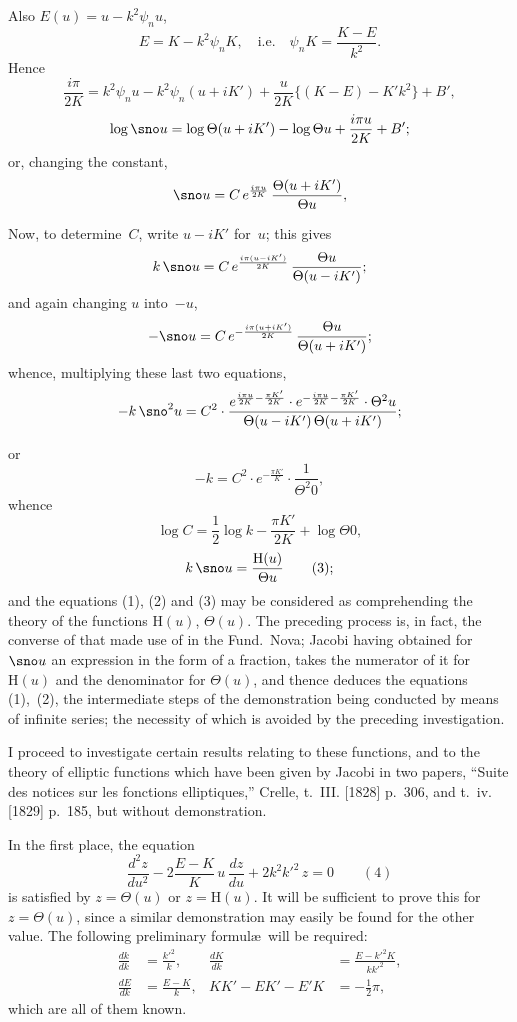 \documentclass[11pt,a4paper]{book}
\begin{document}
Also $E(u) = u - k^2\psi_n u$,
\[
E = K - k^2\psi_n K, \quad \text{i.e.}\quad \psi_n K = \frac{K-E}{k^2}.
\]
Hence
\[
\frac{i\pi}{2K} = k^2\psi_n u - k^2\psi_n(u+iK') + \frac{u}{2K}\{(K-E) - K'k^2\} + B',
\]
\[
\log \sno u = \log \Theta(u+iK') - \log \Theta u + \frac{i\pi u}{2K} + B';
\]
or, changing the constant,
\[
\sno u = C \, e^{\frac{i\pi u}{2K}} \, \frac{\Theta(u+iK')}{\Theta u},
\]

Now, to determine~$C$, write $u-iK'$ for~$u$; this gives
\[
k\,\sno u = C \, e^{\frac{i\pi(u-iK')}{2K}} \, \frac{\Theta u}{\Theta(u-iK')};
\]
and again changing $u$ into~$-u$,
\[
-\sno u = C \, e^{-\frac{i\pi(u+iK')}{2K}} \, \frac{\Theta u}{\Theta(u+iK')};
\]
whence, multiplying these last two equations,
\[
-k\,\sno^2 u = C^2 \cdot \frac{e^{\frac{i\pi u}{2K} - \frac{\pi K'}{2K}} \cdot e^{-\frac{i\pi u}{2K} - \frac{\pi K'}{2K}} \cdot \Theta^2 u}{\Theta(u-iK')\,\Theta(u+iK')};
\]

\newpage
or
\[
-k = C^2 \cdot e^{-\frac{\pi K'}{K}} \cdot \frac{1}{\Theta^2 0},
\]
whence
\[
\log C = \frac{1}{2}\log k - \frac{\pi K'}{2K} + \log \Theta 0,
\]
\[
k\,\sno u = \frac{\mathrm{H}(u)}{\Theta u} \qquad(3);
\]
and the equations (1), (2) and (3) may be considered as comprehending the theory of the functions $\mathrm{H}(u)$, $\Theta(u)$. The preceding process is, in fact, the converse of that made use of in the Fund.\ Nova; Jacobi having obtained for $\sno u$ an expression in the form of a fraction, takes the numerator of it for $\mathrm{H}(u)$ and the denominator for $\Theta(u)$, and thence deduces the equations (1),~(2), the intermediate steps of the demonstration being conducted by means of infinite series; the necessity of which is avoided by the preceding investigation.

I proceed to investigate certain results relating to these functions, and to the theory of elliptic functions which have been given by Jacobi in two papers, ``Suite des notices sur les fonctions elliptiques,'' Crelle, t.~III. [1828] p.~306, and t.~iv. [1829] p.~185, but without demonstration.

In the first place, the equation
\[
\frac{d^2z}{du^2} - 2\frac{E-K}{K}\,u\,\frac{dz}{du} + 2k^2k'^2\,z = 0 \qquad(4)
\]
is satisfied by $z = \Theta(u)$ or $z = \mathrm{H}(u)$. It will be sufficient to prove this for $z = \Theta(u)$, since a similar demonstration may easily be found for the other value. The following preliminary formul\ae\ will be required:
\begin{align*}
\frac{dk}{dk} &= \frac{k'^2}{k}, & \frac{dK}{dk} &= \frac{E-k'^2K}{kk'^2},\\
\frac{dE}{dk} &= \frac{E-K}{k}, &
KK' - EK' - E'K &= -\tfrac{1}{2}\pi,
\end{align*}
which are all of them known.
\end{document}
